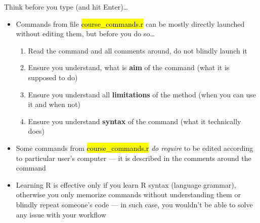\documentclass[compress, ucs, xelatex, 11pt, xcolor=svgnames,
  hyperref={
    bookmarks=true,
    unicode=true,
    colorlinks=true,
    pdftitle={Molecular data in R},
    plainpages=false,
    pdfauthor={Vojtech Zeisek},
    pdfsubject={Course about phylogeny and evolution in R},
    pdfcreator={XeLaTeX},
    pdfkeywords={R, evolution, phylogeny, molecular data},
    linkcolor=Tomato,
    anchorcolor=SaddleBrown,
    citecolor=Goldenrod,
    filecolor=DarkMagenta,
    menucolor=Sienna,
    urlcolor=DarkTurquoise,
    pdftex},
  url={hyphens, lowtilde} %
  ]{beamer}
\renewcommand{\texttt}[1]{\hl{\ttfamily #1}}
\begin{document}
\begin{frame}{Think before you type (and hit Enter)\ldots}
  \begin{itemize}
    \item Commands from file \texttt{course\_commands.r} can be mostly directly launched without editing them, but before you do so\ldots
    \begin{enumerate}
      \item Read the command and all comments around, do not blindly launch it
      \item Ensure you understand, what is \textbf{aim} of the command (what it is supposed to do)
      \item Ensure you understand all \textbf{limitations} of the method (when you can use it and when not)
      \item Ensure you understand \textbf{syntax} of the command (what it technically does)
    \end{enumerate}
    \item Some commands from \texttt{course\_commands.r} \textit{do require} to be edited according to particular user's computer --- it is described in the comments around the command
    \item Learning R is effective only if you learn R syntax (language grammar), otherwise you only memorize commands without understanding them or blindly repeat someone's code --- in such case, you wouldn't be able to solve any issue with your workflow
  \end{itemize}
\end{frame}
\end{document}
